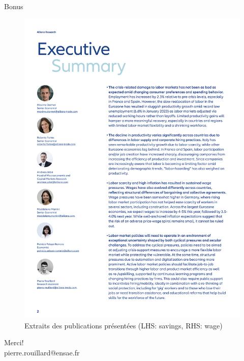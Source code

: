 \documentclass[9pt, xcolor={dvipsnames}]{beamer}
\begin{document}
\begin{frame}{Bonus}
\begin{figure}
\begin{columns}[c]
\begin{column}{0.3\textwidth}
      \includegraphics[width=1.3\textwidth]{img/az2.png}
    \end{column}
    \end{columns}
    \caption{Extraits des publications présentées (LHS: savings, RHS: wage)}
  \end{figure}
  \end{frame}

\begin{frame}
 \begin{center}
		{\Huge Merci!}\\
		\bigskip\bigskip %
		{\LARGE pierre.rouillard@ensae.fr}
	\end{center}
\end{frame}
\end{document}
